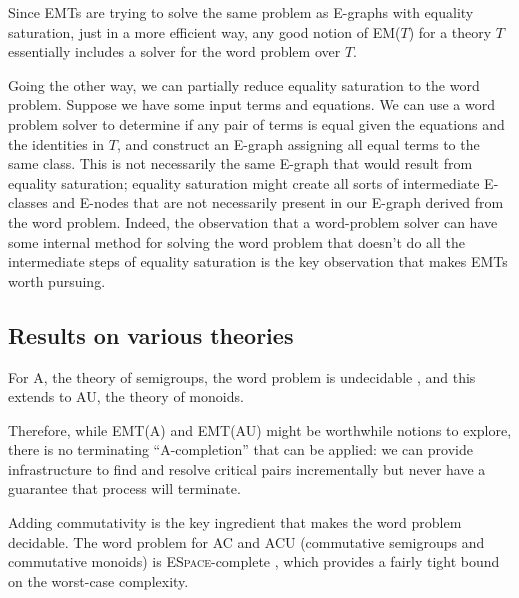 \documentclass[12pt,a4paper,twoside,openright]{report}
\numberwithin{equation}{chapter}		%
\numberwithin{figure}{chapter}			%
\numberwithin{table}{chapter}			%
\theoremstyle{definition}
\theoremstyle{plain}
\begin{document}
Since EMTs are trying to solve the same problem as E-graphs with equality saturation, just in a more efficient way, any good notion of EM($T$) for a theory $T$ essentially includes a solver for the word problem over $T$.

Going the other way, we can partially reduce equality saturation to the word problem. Suppose we have some input terms and equations. We can use a word problem solver to determine if any pair of terms is equal given the equations and the identities in $T$, and construct an E-graph assigning all equal terms to the same class. This is not necessarily the same E-graph that would result from equality saturation; equality saturation might create all sorts of intermediate E-classes and E-nodes that are not necessarily present in our E-graph derived from the word problem. Indeed, the observation that a word-problem solver can have some internal method for solving the word problem that doesn't do all the intermediate steps of equality saturation is the key observation that makes EMTs worth pursuing.



\subsection{Results on various theories} \label{hrmite}
For A, the theory of semigroups, the word problem is undecidable \citep{nyberg-brodda_g_2024}, and this extends to AU, the theory of monoids.

Therefore, while EMT(A) and EMT(AU) might be worthwhile notions to explore, there is no terminating ``A-completion'' that can be applied: we can provide infrastructure to find and resolve critical pairs incrementally but never have a guarantee that process will terminate.

Adding commutativity is the key ingredient that makes the word problem decidable. The word problem for AC and ACU (commutative semigroups and commutative monoids) is \textsc{ESpace}-complete \citep{mayr_complexity_1982}, which provides a fairly tight bound on the worst-case complexity.
\end{document}
